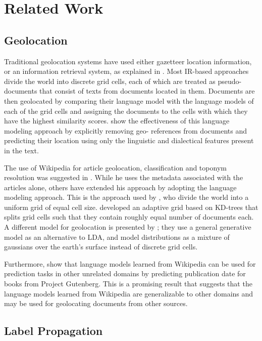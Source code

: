 \section{Related Work} 

\subsection{Geolocation}  
Traditional geolocation systems have used either gazetteer location
information, or an information retrieval system, as explained in
\cite{skiles:12}. Most IR-based approaches divide the world into discrete grid
cells, each of which are treated as pseudo-documents that consist of texts
from documents located in them. Documents are then geolocated by comparing
their language model with the language models of each of the grid cells and
assigning the documents to the cells with which they have the highest
similarity scores. \cite{eisenstein- smith-xing:11} show the effectiveness of
this language modeling approach by explicitly removing geo- references from
documents and predicting their location using only the linguistic and
dialectical features present in the text.

\par The use of Wikipedia for article geolocation, classification and toponym
resolution was suggested in \cite{overell2009geographic}. While he uses the
metadata associated with the articles alone, others have extended his approach
by adopting the language modeling approach.  This is the approach used by
\cite{wing-baldridge:11}, who divide the world into a uniform grid of equal
cell size. \cite{rolleretal:12} developed an adaptive grid based on KD-trees
that splits grid cells such that they contain roughly equal number of
documents each. A different model for geolocation is presented by
\cite{eisensteinetal:11}; they use a general generative model as an
alternative to LDA, and model distributions as a mixture of gaussians over the
earth's surface instead of discrete grid cells.

\par Furthermore, \cite{kumar-et-al:11} show that language models learned from
Wikipedia can be used for prediction tasks in other unrelated domains by
predicting publication date for books from Project Gutenberg. This is a
promising result that suggests that the language models learned from Wikipedia
are generalizable to other domains and may be used for geolocating documents
from other sources.

\subsection{Label Propagation} 

